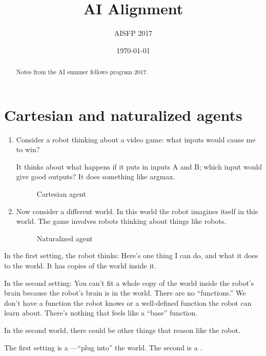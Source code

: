 \documentclass[11pt]{article}
\begin{document}
\title{AI Alignment}

\author{AISFP 2017}

\date{\today}
\maketitle
\begin{abstract}
Notes from the AI summer fellows program 2017.
\end{abstract}

\tableofcontents

\section{Cartesian and naturalized agents}

\begin{enumerate}
\item
Consider a robot thinking about a video game: what inputs would cause me to win?

It thinks about what happens if it puts in inputs A and B; which input would give good outputs? It does something like argmax. 

\begin{figure}
\caption{Cartesian agent}
\end{figure}
\item
Now consider a different world. In this world the robot imagines itself in this world. The game involves robots thinking about things like robots.

\begin{figure}
\caption{Naturalized agent}
\end{figure}
\end{enumerate}
In the first setting, the robot thinks: Here's one thing I can do, and what it does to the world. It has copies of the world inside it. 

In the second setting: You can't fit a whole copy of the world inside the robot's brain because the robot's brain is in the world. There are no ``functions.'' We don't have a function the robot knows or a well-defined function the robot can learn about. There's nothing that feels like a ``base'' function.

In the second world, there could be other things that reason like the robot.

The first setting is a ---``plug into'' the world. The second is a . 
\end{document}

